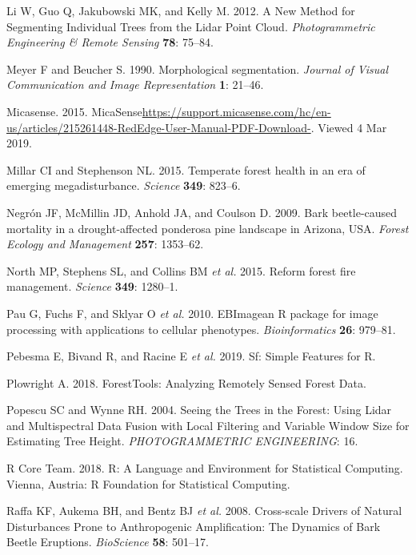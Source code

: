 \documentclass[]{article}
\begin{document}
\hypertarget{ref-li2012}{}
Li W, Guo Q, Jakubowski MK, and Kelly M. 2012. A New Method for
Segmenting Individual Trees from the Lidar Point Cloud.
\emph{Photogrammetric Engineering \& Remote Sensing} \textbf{78}:
75--84.

\hypertarget{ref-meyer1990}{}
Meyer F and Beucher S. 1990. Morphological segmentation. \emph{Journal
of Visual Communication and Image Representation} \textbf{1}: 21--46.

\hypertarget{ref-micasense2015}{}
Micasense. 2015.
MicaSense\url{https://support.micasense.com/hc/en-us/articles/215261448-RedEdge-User-Manual-PDF-Download-}.
Viewed 4 Mar 2019.

\hypertarget{ref-millar2015}{}
Millar CI and Stephenson NL. 2015. Temperate forest health in an era of
emerging megadisturbance. \emph{Science} \textbf{349}: 823--6.

\hypertarget{ref-negron2009}{}
Negrón JF, McMillin JD, Anhold JA, and Coulson D. 2009. Bark
beetle-caused mortality in a drought-affected ponderosa pine landscape
in Arizona, USA. \emph{Forest Ecology and Management} \textbf{257}:
1353--62.

\hypertarget{ref-north2015}{}
North MP, Stephens SL, and Collins BM \emph{et al.} 2015. Reform forest
fire management. \emph{Science} \textbf{349}: 1280--1.

\hypertarget{ref-pau2010}{}
Pau G, Fuchs F, and Sklyar O \emph{et al.} 2010. EBImagean R package for
image processing with applications to cellular phenotypes.
\emph{Bioinformatics} \textbf{26}: 979--81.

\hypertarget{ref-pebesma2019}{}
Pebesma E, Bivand R, and Racine E \emph{et al.} 2019. Sf: Simple
Features for R.

\hypertarget{ref-plowright2018}{}
Plowright A. 2018. ForestTools: Analyzing Remotely Sensed Forest Data.

\hypertarget{ref-popescu2004}{}
Popescu SC and Wynne RH. 2004. Seeing the Trees in the Forest: Using
Lidar and Multispectral Data Fusion with Local Filtering and Variable
Window Size for Estimating Tree Height. \emph{PHOTOGRAMMETRIC
ENGINEERING}: 16.

\hypertarget{ref-rcoreteam2018}{}
R Core Team. 2018. R: A Language and Environment for Statistical
Computing. Vienna, Austria: R Foundation for Statistical Computing.

\hypertarget{ref-raffa2008}{}
Raffa KF, Aukema BH, and Bentz BJ \emph{et al.} 2008. Cross-scale
Drivers of Natural Disturbances Prone to Anthropogenic Amplification:
The Dynamics of Bark Beetle Eruptions. \emph{BioScience} \textbf{58}:
501--17.
\end{document}
